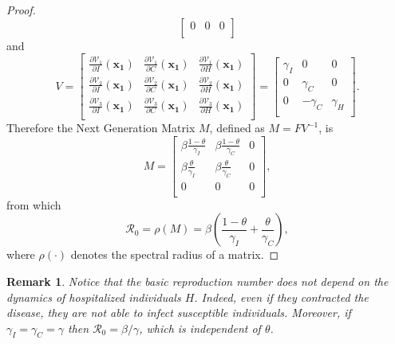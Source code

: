 \documentclass[11pt,reqno]{amsart}
\theoremstyle{boldremark}
\newtheorem{remark}{Remark}
\begin{document}
\begin{proof}
\begin{equation*}
\begin{bmatrix}
        0 & 0 & 0 \\
    \end{bmatrix}
    \end{equation*}
    and 
    \begin{equation*}
    V = 
    \begin{bmatrix}
    \frac{\partial \mathcal{V}_1}{\partial I} (\mathbf{x_1}) & \frac{\partial \mathcal{V}_1}{\partial C} (\mathbf{x_1})  & \frac{\partial \mathcal{V}_1}{\partial H} (\mathbf{x_1})\\
    \frac{\partial \mathcal{V}_2}{\partial I} (\mathbf{x_1}) & \frac{\partial \mathcal{V}_2}{\partial C} (\mathbf{x_1})  & \frac{\partial \mathcal{V}_2}{\partial H} (\mathbf{x_1})\\
    \frac{\partial \mathcal{V}_3}{\partial I} (\mathbf{x_1}) & \frac{\partial \mathcal{V}_3}{\partial C} (\mathbf{x_1})  & \frac{\partial \mathcal{V}_3}{\partial H} (\mathbf{x_1})\\
    \end{bmatrix}
    = 
    \begin{bmatrix}
        \gamma_I & 0 & 0 \\ 
        0 & \gamma_C & 0 \\ 
        0 & -\gamma_C & \gamma_H \\
    \end{bmatrix}. 
    \end{equation*}
    Therefore the Next Generation Matrix $M$, defined as $M=F V^{-1}$, is \cite{1}
    \begin{equation*}
        M=
        \begin{bmatrix}
            \beta \frac{1-\theta}{\gamma_I} & \beta \frac{1-\theta}{\gamma_C} & 0 \\ 
            \beta \frac{\theta}{\gamma_I} & \beta \frac{\theta}{\gamma_C} & 0 \\ 
            0 & 0 & 0 \\ 
        \end{bmatrix},
    \end{equation*}
    from which 
    \begin{equation*}
        \mathcal{R}_0=\rho(M)=\beta\left(\frac{1-\theta}{\gamma_I}+\frac{\theta}{\gamma_C}\right),
    \end{equation*}
    where $\rho(\cdot)$ denotes the spectral radius of a matrix. 
\end{proof}

\begin{remark}
    Notice that the basic reproduction number does not depend on the dynamics of hospitalized individuals $H$. Indeed, even if they contracted the disease, they are not able to infect susceptible individuals. Moreover, if $\gamma_I=\gamma_C=\gamma$ then $\mathcal{R}_0=\beta/\gamma$, which is independent of $\theta$. 
\end{remark}
\end{document}
